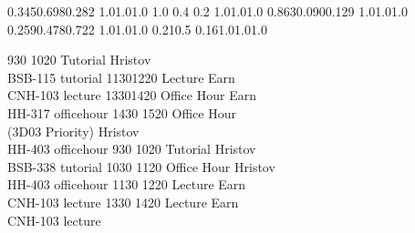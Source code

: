 
\noindent{}

\setslotsize{3.1cm}{0.5cm}
\settextframe{0.8mm}




    {0.345}{0.698}{0.282} {1.0}{1.0}{1.0}
    {1.0} {0.4} {0.2} {1.0}{1.0}{1.0}
 {0.863}{0.090}{0.129} {1.0}{1.0}{1.0}
   {0.259}{0.478}{0.722} {1.0}{1.0}{1.0}
       {0.21}{0.5} {0.16}{1.0}{1.0}{1.0}

\begin{timetable}
   {930} {1020} {Tutorial}       {Hristov\\BSB-115} {}      {tutorial}
   {1130}{1220} {Lecture}        {Earn\\CNH-103}    {}      {lecture}
   {1330}{1420} {Office Hour}    {Earn\\HH-317}    {}      {officehour}
   {1430} {1520} {Office Hour\\{\small(3D03 Priority)}}   {Hristov\\HH-403} {}      {officehour}
   {930} {1020} {Tutorial}       {Hristov\\BSB-338} {}      {tutorial}
   {1030} {1120} {Office Hour}   {Hristov\\HH-403} {}      {officehour}
   {1130} {1220} {Lecture}        {Earn\\CNH-103}   {}      {lecture}
   {1330} {1420} {Lecture}        {Earn\\CNH-103}   {}      {lecture}
\end{timetable}
